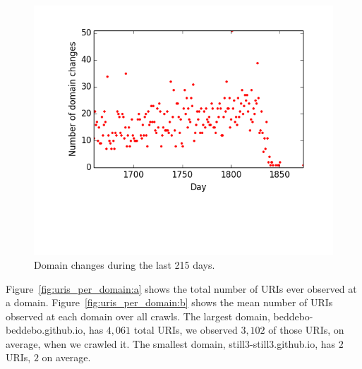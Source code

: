 \documentclass[11pt, twocolumn]{article}
\def \afterio {215}
\def \largestdomainname {beddebo-beddebo.github.io}
\def \largestdomaintotal {4,061}
\def \largestdomainmean {3,102}
\def \smallestdomainname {still3-still3.github.io}
\def \smallestdomaintotal {2}
\def \smallestdomainmean {2}
\begin{document}
    \begin{figure}
      \centering
      \includegraphics[width=\linewidth]{images/domain_changes_per_day_last.png}
      \caption{Domain changes during the last \afterio{} days.}
      \label{fig:domain_changes_per_day:b}
    \end{figure}
    
    Figure~\ref{fig:uris_per_domain:a} shows the total number of URIs ever observed at a domain. Figure~\ref{fig:uris_per_domain:b} shows the mean number of URIs observed at each domain over all crawls. The largest domain, \largestdomainname{}, has $\largestdomaintotal$ total URIs, we observed $\largestdomainmean$ of those URIs, on average, when we crawled it. The smallest domain, \smallestdomainname{}, has $\smallestdomaintotal$ URIs, $\smallestdomainmean$ on average.

\end{document}
